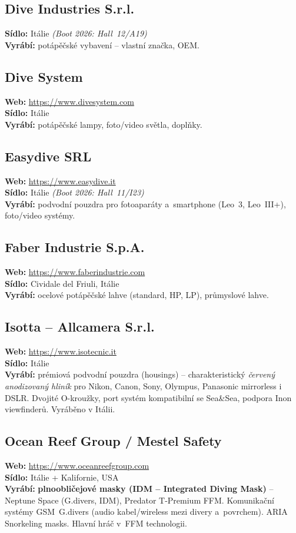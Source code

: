 \documentclass[11pt,a4paper]{article}
\begin{document}
\subsection{Dive Industries S.r.l.}
\textbf{Sídlo:} Itálie \quad\emph{(Boot 2026: Hall~12/A19)} \\
\textbf{Vyrábí:} potápěčské vybavení -- vlastní značka, OEM.

\subsection{Dive System}
\textbf{Web:} \url{https://www.divesystem.com} \\
\textbf{Sídlo:} Itálie \\
\textbf{Vyrábí:} potápěčské lampy, foto/video světla, doplňky.

\subsection{Easydive SRL}
\textbf{Web:} \url{https://www.easydive.it} \\
\textbf{Sídlo:} Itálie \quad\emph{(Boot 2026: Hall~11/I23)} \\
\textbf{Vyrábí:} podvodní pouzdra pro fotoaparáty a~smartphone (Leo~3, Leo~III+), foto/video systémy.

\subsection{Faber Industrie S.p.A.}
\textbf{Web:} \url{https://www.faberindustrie.com} \\
\textbf{Sídlo:} Cividale del Friuli, Itálie \\
\textbf{Vyrábí:} ocelové potápěčské lahve (standard, HP, LP), průmyslové lahve.

\subsection{Isotta -- Allcamera S.r.l.}
\textbf{Web:} \url{https://www.isotecnic.it} \\
\textbf{Sídlo:} Itálie \\
\textbf{Vyrábí:} prémiová podvodní pouzdra (housings) -- charakteristický \emph{červený anodizovaný hliník} pro Nikon, Canon, Sony, Olympus, Panasonic mirrorless i DSLR. Dvojité O-kroužky, port systém kompatibilní se Sea\&Sea, podpora Inon viewfinderů. Vyráběno v Itálii.

\subsection{Ocean Reef Group / Mestel Safety}
\textbf{Web:} \url{https://www.oceanreefgroup.com} \\
\textbf{Sídlo:} Itálie + Kalifornie, USA \\
\textbf{Vyrábí:} \textbf{plnoobličejové masky (IDM -- Integrated Diving Mask)} -- Neptune Space (G.divers, IDM), Predator T-Premium FFM. Komunikační systémy GSM~G.divers (audio kabel/wireless mezi divery a~povrchem). ARIA Snorkeling masks. Hlavní hráč v~FFM technologii.
\end{document}
